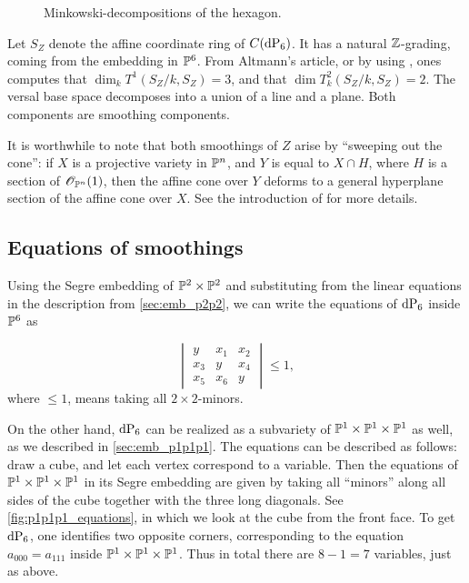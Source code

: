 \begin{figure}
\centering 

\caption{Minkowski-decompositions of the hexagon.}
\label{fig:minkowski_decompositions}
\end{figure}

Let $S_Z$ denote the affine coordinate ring of $C(\dP6)$. It has a natural $\Z$-grading, coming from the embedding in $\P^6$. From Altmann's article, or by using \MM, ones computes that $\dim_k T^1(S_Z/k,S_Z)=3$, and that $\dim T^2_k(S_Z/k, S_Z)=2$. The versal base space decomposes into a union of a line and a plane. Both components are smoothing components.

It is worthwhile to note that both smoothings of $Z$ arise by ``sweeping out the cone'': if $X$ is a projective variety in $\P^n$, and $Y$ is equal to $X \cap H$, where $H$ is a section of $\OO_{\P^n}(1)$, then the affine cone over $Y$ deforms to a general hyperplane section of the affine cone over $X$. See the introduction of \cite{stevens_deformations} for more details.

\subsection{Equations of smoothings}

Using the Segre embedding of $\P^2 \times \P^2$ and substituting from the linear equations in the description from \cref{sec:emb_p2p2}, we can write the equations of $\dP6$ inside $\P^6$ as

\begin{equation}
\begin{vmatrix}
y & x_1 & x_2 \\
x_3 & y & x_4 \\
x_5 & x_6 & y
\end{vmatrix} \leq 1,
\end{equation}
where $\leq 1$, means taking all $2 \times 2$-minors.

On the other hand, $\dP6$ can be realized as a subvariety of $\P^1 \times \P^1 \times \P^1$ as well, as we described in \cref{sec:emb_p1p1p1}. The equations can be described as follows: draw a cube, and let each vertex correspond to a variable. Then the equations of $\P^1 \times \P^1 \times \P^1$ in its Segre embedding are given by taking all ``minors'' along all sides of the cube together with the three long diagonals. See \cref{fig:p1p1p1_equations}, in which we look at the cube from the front face. To get $\dP6$, one identifies two opposite corners, corresponding to the equation $a_{000}=a_{111}$ inside $\P^1 \times \P^1 \times \P^1$. Thus in total there are $8-1=7$ variables, just as above. 

